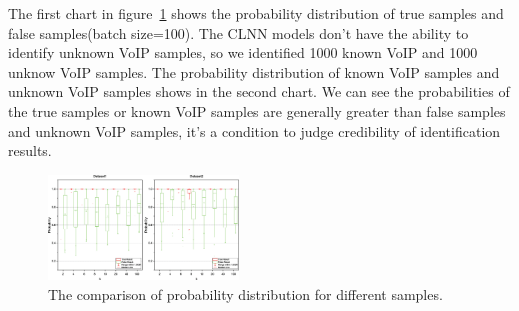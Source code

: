 \documentclass[conference]{IEEEtran}
\begin{document}

The first chart in figure~\ref{fig:tf} shows the probability distribution of true samples and false samples(batch size=100). The CLNN models don't have the ability to identify unknown VoIP samples, so we identified 1000 known VoIP and 1000 unknow VoIP samples. The probability distribution of known VoIP samples and unknown VoIP samples shows in the second chart. We can see the probabilities of the true samples or known VoIP samples are generally greater than false samples and unknown VoIP samples, it's a condition to judge credibility of identification results. 
\begin{figure}[htp]
\begin{center}
\includegraphics[width=0.45\textwidth]{tf.eps}
\caption{The comparison of probability distribution for different samples.}\label{fig:tf}
\end{center}
\end{figure}
\end{document}
